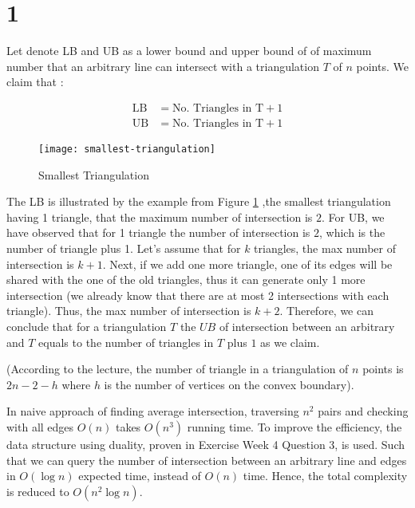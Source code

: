 
\section*{1}

Let denote LB and UB as a lower bound and upper bound of
of maximum number that an arbitrary line can intersect with a
triangulation $T$ of $n$ points. We claim that :

\begin{align*}
    \mathrm{LB} &= \text{No. Triangles in T} + 1\\
    \mathrm{UB} &= \text{No. Triangles in T} + 1
\end{align*}
\begin{figure}[h]
    \begin{center}
        \texttt{[image: smallest-triangulation]}
        \caption{Smallest Triangulation}
        \label{fig:smallest-triangulation}
    \end{center}
\end{figure}

The LB is illustrated by the example from Figure \ref{fig:smallest-triangulation}
,the smallest triangulation having 1 triangle, that the maximum number of intersection is $2$.
For UB, we have observed that for 1 triangle the number of intersection is $2$,
which is the number of triangle plus 1. Let's assume that for $k$ triangles,
the max number of intersection is $k+1$. Next, if we add one more triangle,
one of its edges will be shared with the one of the old triangles, thus
it can generate only 1 more intersection (we already know that there are at most 2 intersections
with each triangle). Thus, the max number of intersection
is $k+2$. Therefore, we can conclude that for a triangulation $T$ the $UB$ of
intersection between an arbitrary and $T$ equals to the number of triangles
in $T$ plus $1$ as we claim.

(According to the lecture, the number of triangle in a triangulation of $n$ points is $2n - 2 - h$ where $h$
is the number of vertices on the convex boundary).

In naive approach of finding average intersection, traversing $n^2$ pairs and checking with all edges $O(n)$
takes $O(n^3)$ running time. To improve the efficiency, the data structure using duality, proven in Exercise Week 4 Question 3,
is used. Such that we can query the number of intersection between an arbitrary line and
edges in $O(\log{n})$ expected time, instead of $O(n)$ time. Hence, the total complexity is reduced to $O(n^2 \log {n})$.
